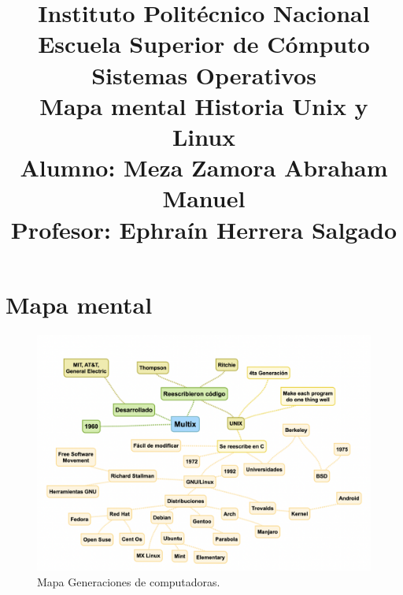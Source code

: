 \documentclass[a4paper,12pt]{article}
\begin{document}
\title{\Large Instituto Politécnico Nacional\\Escuela Superior de Cómputo\\Sistemas Operativos\\ Mapa mental Historia Unix y Linux \\Alumno: Meza Zamora Abraham Manuel\\Profesor: Ephra\'in Herrera Salgado}
\date{}
\maketitle

\section{Mapa mental} 
\begin{figure}[h]
\center
\includegraphics[scale=.35]{uno}
\caption{Mapa Generaciones de computadoras.}
\end{figure}
\justify 
\end{document}
